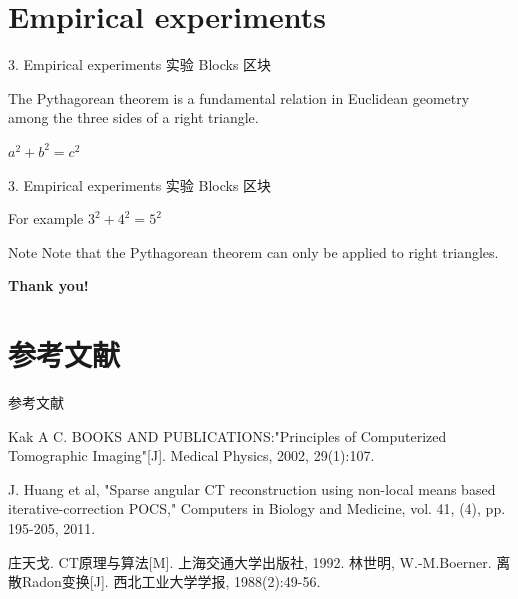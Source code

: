 \documentclass{beamer}
\begin{document}
  \section{Empirical experiments}
  \label{Sec:experiments}
  \begin{frame}{3. Empirical experiments 实验}
    Blocks 区块

      \begin{definition}
        The Pythagorean theorem is a fundamental relation in Euclidean geometry among the three sides of a right triangle.
      \end{definition}

      \begin{theorem}
        $a^2 + b^2 = c^2$
      \end{theorem}
  \end{frame} 

  \begin{frame}{3. Empirical experiments 实验}
    Blocks 区块

      \begin{exampleblock}{For example}
        $3^2 + 4^2 = 5^2$
      \end{exampleblock}

      \begin{alertblock}{Note}
         Note that the Pythagorean theorem can only be applied to right triangles.
      \end{alertblock}
  \end{frame} 

  \begin{frame}
    \begin{center}
      \Huge{\bf{Thank you!}}
    \end{center}
  \end{frame} %
  \section{参考文献}
  \begin{frame}{参考文献}
    \begin{thebibliography}{0}
      
      Kak A C. BOOKS AND PUBLICATIONS:"Principles of Computerized Tomographic Imaging"[J]. Medical Physics, 2002, 29(1):107.
      
      J. Huang et al, "Sparse angular CT reconstruction using non-local means based iterative-correction POCS," Computers in Biology and Medicine, vol. 41, (4), pp. 195-205, 2011.
      
      庄天戈. CT原理与算法[M]. 上海交通大学出版社, 1992.
      林世明, W.-M.Boerner. 离散Radon变换[J]. 西北工业大学学报, 1988(2):49-56.
      \end{thebibliography}
  \end{frame} %


\end{document}
